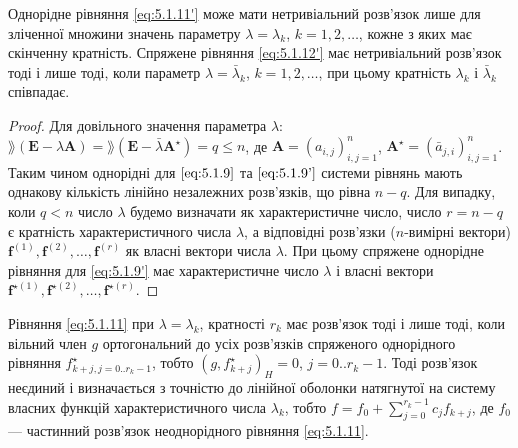 \begin{theorem}
    Однорідне рівняння \eqref{eq:5.1.11'} може мати нетривіальний розв'язок лише для зліченної множини значень параметру $\lambda = \lambda_k$, $k = 1, 2, \ldots$, кожне з яких має скінченну кратність. Спряжене рівняння \eqref{eq:5.1.12'} має нетривіальний розв'язок тоді і лише тоді, коли параметр $λ = \bar \lambda_k$, $k = 1, 2, \ldots$, при цьому кратність $\lambda_k$ і $\bar \lambda_k$ співпадає.
\end{theorem}

\begin{proof}
    Для довільного значення параметра $\lambda$: $\rang (\textbf{E} - \lambda \textbf{A}) = \rang (\textbf{E} - \bar \lambda \textbf{A}^\star) = q \le n$, де $\textbf{A} = (a_{i,j})_{i,j=1}^n$, $\textbf{A}^\star = (\bar a_{j,i})_{i,j=1}^n$. Таким чином однорідні для $\eqref{eq:5.1.9}$ та $\eqref{eq:5.1.9'}$ системи рівнянь мають однакову кількість лінійно незалежних розв'язків, що рівна $n - q$. Для випадку, коли $q < n$ число $\lambda$ будемо визначати як характеристичне число, число $r = n - q$ є кратність характеристичного числа $\lambda$, а відповідні розв'язки ($n$-вимірні вектори) $\textbf{f}^{(1)}, \textbf{f}^{(2)}, \ldots, \textbf{f}^{(r)}$ як власні вектори числа $\lambda$. При цьому спряжене однорідне рівняння для \eqref{eq:5.1.9'} має характеристичне число $\lambda$ і власні вектори $\textbf{f}^{\star(1)}, \textbf{f}^{\star(2)}, \ldots, \textbf{f}^{\star(r)}$.
\end{proof}

\begin{theorem}
    Рівняння \eqref{eq:5.1.11} при $\lambda = \lambda_k$, кратності $r_k$ має розв'язок тоді і лише тоді, коли вільний член $g$ ортогональний до усіх розв'язків спряженого однорідного рівняння $f_{k + j, j = 0..r_k-1}^\star$, тобто $(g, f_{k+j}^\star)_H = 0$, $j=0..r_k-1$. Тоді розв'язок неєдиний і визначається з точністю до лінійної оболонки натягнутої на систему власних функцій характеристичного числа $\lambda_k$, тобто $f = f_0 + \sum_{j = 0}^{r_k - 1} c_j f_{k + j}$, де $f_0$ --- частинний розв'язок неоднорідного рівняння \eqref{eq:5.1.11}.
\end{theorem}

